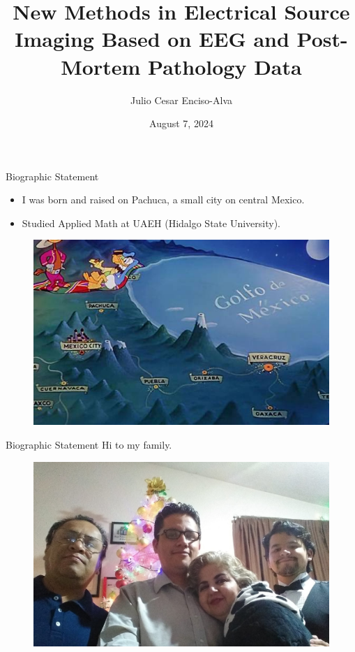 \documentclass[progressbar=head]{beamer}
\title{New Methods in Electrical Source Imaging Based on EEG and Post-Mortem Pathology Data}
\date{August 7, 2024}
\author{Julio Cesar Enciso-Alva}
\institute{University   of Texas at Arlington}
\begin{document}



{
\maketitle

\begin{frame}%
\end{frame}
}


\begin{frame}{Biographic Statement}
\begin{itemize}
\item I was born and raised on Pachuca, a small city on central Mexico.
\item Studied Applied Math at UAEH (Hidalgo State University).
\end{itemize}
\begin{figure}
\centering
\includegraphics[width=0.7\linewidth]{./img_dev3/caballeros}
\end{figure}
\end{frame}

\begin{frame}{Biographic Statement}
Hi to my family.
\begin{figure}
\centering
\includegraphics[width=0.75\linewidth]{./img_dev3/family}
\end{figure}
\end{frame}
\end{document}
